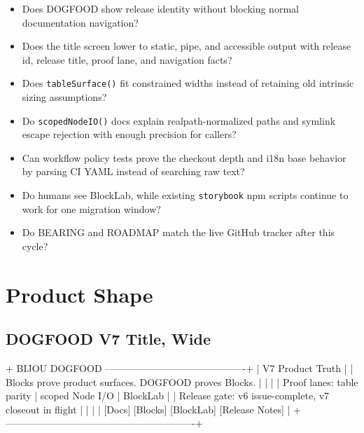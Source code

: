 \begin{itemize}
\tightlist
\item
  Does DOGFOOD show release identity without blocking normal documentation navigation?
\item
  Does the title screen lower to static, pipe, and accessible output with release id, release title, proof lane, and navigation facts?
\item
  Does \texttt{t\allowbreak{}a\allowbreak{}b\allowbreak{}l\allowbreak{}e\allowbreak{}S\allowbreak{}u\allowbreak{}r\allowbreak{}f\allowbreak{}a\allowbreak{}c\allowbreak{}e\allowbreak{}(\allowbreak{})} fit constrained widths instead of retaining old intrinsic sizing assumptions?
\item
  Do \texttt{s\allowbreak{}c\allowbreak{}o\allowbreak{}p\allowbreak{}e\allowbreak{}d\allowbreak{}N\allowbreak{}o\allowbreak{}d\allowbreak{}e\allowbreak{}I\allowbreak{}O\allowbreak{}(\allowbreak{})} docs explain realpath-normalized paths and symlink escape rejection with enough precision for callers?
\item
  Can workflow policy tests prove the checkout depth and i18n base behavior by parsing CI YAML instead of searching raw text?
\item
  Do humans see BlockLab, while existing \texttt{s\allowbreak{}t\allowbreak{}o\allowbreak{}r\allowbreak{}y\allowbreak{}b\allowbreak{}o\allowbreak{}o\allowbreak{}k} npm scripts continue to work for one migration window?
\item
  Do BEARING and ROADMAP match the live GitHub tracker after this cycle?
\end{itemize}

\section{Product Shape}\label{record-101-product-shape}

\subsection{DOGFOOD V7 Title, Wide}\label{record-101-dogfood-v7-title-wide}

\begin{CodeBlock}
+ BIJOU DOGFOOD -------------------------------------------+
| V7 Product Truth                                         |
| Blocks prove product surfaces. DOGFOOD proves Blocks.    |
|                                                          |
| Proof lanes: table parity | scoped Node I/O | BlockLab   |
| Release gate: v6 issue-complete, v7 closeout in flight   |
|                                                          |
| [Docs] [Blocks] [BlockLab] [Release Notes]               |
+----------------------------------------------------------+
\end{CodeBlock}


